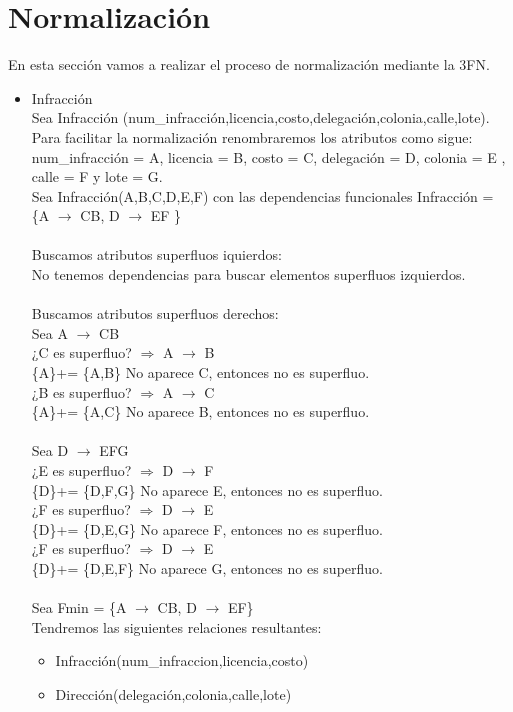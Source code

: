 \documentclass{article}
\begin{document}
\section{Normalización}
En esta sección vamos a realizar el proceso de normalización mediante la 3FN.\\
\begin{itemize}
\item 
Infracción\\ Sea Infracción (num\_infracción,licencia,costo,delegación,colonia,calle,lote).\\
Para facilitar la normalización renombraremos los atributos como sigue:
num\_infracción = A, licencia = B, costo = C, delegación = D, colonia = E , calle = F y lote = G.\\
Sea Infracción(A,B,C,D,E,F) con las dependencias funcionales 
Infracción = \{A $\rightarrow$ CB, D $\rightarrow$ EF \} \\
\\
Buscamos atributos superfluos iquierdos:\\
No tenemos dependencias para buscar elementos superfluos izquierdos.\\
\\
Buscamos atributos superfluos derechos:\\
Sea A $\rightarrow$ CB \\
¿C es superfluo? $\Rightarrow$ A $\rightarrow$ B \\
\{A\}+= \{A,B\} No aparece C, entonces no es superfluo.\\
¿B es superfluo? $\Rightarrow$ A $\rightarrow$ C \\
\{A\}+= \{A,C\} No aparece B, entonces no es superfluo.\\
\\
Sea D $\rightarrow$ EFG\\
¿E es superfluo? $\Rightarrow$ D $\rightarrow$ F \\
\{D\}+= \{D,F,G\} No aparece E, entonces no es superfluo.\\
¿F es superfluo? $\Rightarrow$ D $\rightarrow$ E \\
\{D\}+= \{D,E,G\} No aparece F, entonces no es superfluo.\\
¿F es superfluo? $\Rightarrow$ D $\rightarrow$ E \\
\{D\}+= \{D,E,F\} No aparece G, entonces no es superfluo.\\
\\
Sea Fmin = \{A $\rightarrow$ CB, D $\rightarrow$ EF\}\\
Tendremos las siguientes relaciones resultantes:
\begin{itemize}
\item Infracción(num\_infraccion,licencia,costo)
\item Dirección(delegación,colonia,calle,lote)
\end{itemize}


\end{itemize}
\end{document}
